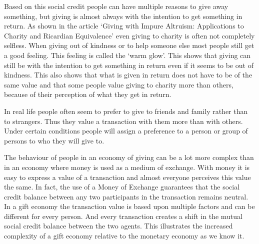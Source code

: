 \documentclass[twoside,openright]{uva-bachelor-thesis}
\begin{document}
Based on this social credit people can have multiple reasons to give away something, but giving is almost always with the intention to get something in return. As shown in the article ‘Giving with Impure Altruism: Applications to Charity and Ricardian Equivalence’\cite{andreoni1989giving} even giving to charity is often not completely selfless. When giving out of kindness or to help someone else most people still get a good feeling. This feeling is called the ‘warm glow’\cite{andreoni1989giving}. This shows that giving can still be with the intention to get something in return even if it seems to be out of kindness. This also shows that what is given in return does not have to be of the same value and that some people value giving to charity more than others, because of their perception of what they get in return.

In real life people often seem to prefer to give to friends and family rather than to strangers. Thus they value a transaction with them more than with others. Under certain conditions people will assign a preference to a person or group of persons to who they will give to.

The behaviour of people in an economy of giving can be a lot more complex than in an economy where money is used as a medium of exchange. With money it is easy to express a value of a transaction and almost everyone perceives this value the same. In fact, the use of a Money of Exchange\cite{weijland2014mathematical} guarantees that the social credit balance between any two participants in the transaction remains neutral. In a gift economy the transaction value is based upon multiple factors and can be different for every person. And every transaction creates a shift in the mutual social credit balance between the two agents. This illustrates the increased complexity of a gift economy relative to the monetary economy as we know it.
\end{document}
